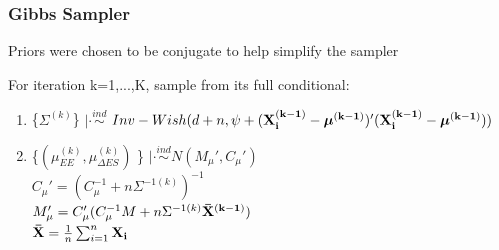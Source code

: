 \documentclass[handout]{beamer}\usepackage[]{graphicx}\usepackage[]{color}
\begin{document}
\begin{frame}
\frametitle{Gibbs Sampler}
Priors were chosen to be conjugate to help simplify the sampler \\

\vspace{0.3cm}

For iteration k=1,...,K, sample from its full conditional:

\begin{enumerate}
% 
% 
% 




\item
 \{$\Sigma^{(k)}$\} $|\cdot \overset{ind}{\sim}$ $Inv-Wish(d+n,\psi+({\bf X_{i}^{(k-1)} - \boldsymbol{\mu}^{(k-1)}})'({\bf X_{i}^{(k-1)} - \boldsymbol{\mu}^{(k-1)}}))$ \\




\item
  \{$(\mu_{EE}^{(k)},\mu_{\Delta ES}^{(k)})$ \} $|\cdot \overset{ind}{\sim} N(M_{\mu}',C_{\mu}')$ \\
$C_{\mu}' = (C_{\mu}^{-1} + n \Sigma^{-1(k)})^{-1}$ \\
$M_{\mu}' = C_{\mu}'(C_{\mu}^{-1}M + n \Sigma^{-1(k)} {\bf \bar{X}^{(k-1)}})$ \\
${\bf \bar{X}} = \frac{1}{n}\sum_{i=1}^{n} {\bf X_{i}}$ \\


\end{enumerate}
\end{frame}
\end{document}
